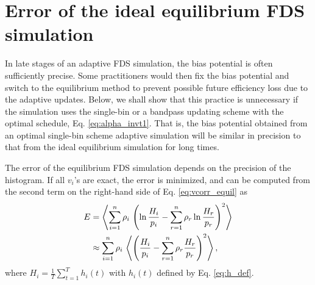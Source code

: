 \documentclass[reprint, floatfix]{revtex4-1}
\begin{document}
\section{\label{sec:equilerr}
Error of the ideal equilibrium FDS simulation}




In late stages of an adaptive FDS simulation,
the bias potential is often sufficiently precise.
Some practitioners would then fix
the bias potential and switch
to the equilibrium method
to prevent possible future efficiency loss
due to the adaptive updates.
%
Below, we shall show that this practice is unnecessary
if the simulation uses the single-bin or a bandpass updating scheme
with the optimal schedule, Eq. \eqref{eq:alpha_invt1}.
%
That is, the bias potential obtained from
an optimal single-bin scheme adaptive simulation
will be similar in precision to that from
the ideal equilibrium simulation
for long times.
%

The error of the equilibrium FDS simulation
depends on the precision of the histogram.
%
If all $v_i$'s are exact,
the error is minimized, and can be computed
from the second term
on the right-hand side of Eq. \eqref{eq:vcorr_equil} as
%
\begin{align}
  E
  &=
  \left\langle
    \sum_{ i = 1 }^ n
      \rho_i \,
      \left(
        \ln \frac { H_i }
                  { p_i }
        -
        \sum_{r = 1}^n \rho_r
        \ln \frac { H_r }
                  { p_r }
      \right)^2
  \right\rangle
  \notag
  \\
  &
  \approx
  \sum_{ i = 1 }^ n
    \rho_i \,
    \left\langle
      \left(
        \frac { H_i }
              { p_i }
        -
        \sum_{r = 1}^n \rho_r
            \frac { H_r }
                  { p_r }
      \right)^2
    \right\rangle,
\notag
\end{align}
where
$H_i = \frac{1}{T} \sum_{t = 1}^T h_i(t)$
with
$h_i(t)$ defined by Eq. \eqref{eq:h_def}.
\end{document}
